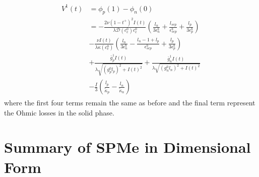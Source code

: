 \documentclass[preprint]{elsarticle}
\begin{document}
\begin{align}
 \begin{split} 
V^1(t) &= \phi_p(1) - \phi_n(0) \\ 
	&=-\frac{2 \nu (1-t^+)^2I(t)}{\lambda \mathcal{D}(c_e^0)c_e^0}\left( \frac{l_n}{3 \epsilon_n^b} + \frac{l_{sep}}{\epsilon_{sep}^b} + \frac{l_p}{3\epsilon_p^b} \right) \\ 
    & - \frac{\nu I(t)}{\lambda \kappa(c_e^0)} \left(\frac{l_n}{3\epsilon_n^b} - \frac{l_n - 1 + l_p}{\epsilon_{sep}^b} + \frac{l_p}{3\epsilon_p^b} \right) \\
    &+ \frac{\bar{g}_p^1 I(t) }{\lambda \sqrt{(g_p^0l_p)^2+I(t)^2}} + \frac{\bar{g}_n^1 I(t) }{\lambda \sqrt{(g_n^0l_n)^2+I(t)^2}} \\ 
    & - \frac{I}{3}\left(\frac{l_p}{\tilde{\kappa}_p}-\frac{l_n}{\tilde{\kappa}_n}\right) 
\end{split}
\end{align} 
where the first four terms remain the same as before and the final term represent the Ohmic losses in the solid phase. 
\section{Summary of SPMe in Dimensional Form}
\end{document}
